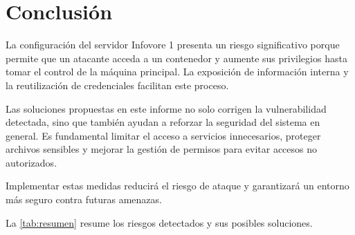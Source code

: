 \section{Conclusión}

La configuración del servidor Infovore 1 presenta un riesgo significativo porque permite que un atacante acceda a un contenedor y aumente sus privilegios hasta tomar el control de la máquina principal. La exposición de información interna y la reutilización de credenciales facilitan este proceso. 

Las soluciones propuestas en este informe no solo corrigen la vulnerabilidad detectada, sino que también ayudan a reforzar la seguridad del sistema en general. Es fundamental limitar el acceso a servicios innecesarios, proteger archivos sensibles y mejorar la gestión de permisos para evitar accesos no autorizados. 

Implementar estas medidas reducirá el riesgo de ataque y garantizará un entorno más seguro contra futuras amenazas.

La \autoref{tab:resumen} resume los riesgos detectados y sus posibles soluciones.


